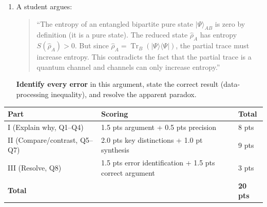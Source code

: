 \documentclass[11pt,a4paper]{article}
\begin{document}
\begin{tcolorbox}[gradconceptbox, title={Part III --- Identify and Resolve \hfill\normalfont 1 $\times$ 3 pts = 3 pts}]

\begin{enumerate}[leftmargin=1.8em, label=\textbf{Q\arabic*.}, itemsep=14pt, start=8]

\item {}
  A student argues:
  \begin{quote}
  ``The entropy of an entangled bipartite pure state $|\Psi\rangle_{AB}$ is zero
  by definition (it is a pure state). The reduced state $\hat{\rho}_A$ has entropy
  $S(\hat{\rho}_A)>0$. But since $\hat{\rho}_A=\operatorname{Tr}_B(|\Psi\rangle\langle\Psi|)$,
  the partial trace must increase entropy. This contradicts the fact that the
  partial trace is a quantum channel and channels can only increase entropy.''
  \end{quote}
  \textbf{Identify every error} in this argument, state the correct result
  (data-processing inequality), and resolve the apparent paradox.

  \vspace{4cm}

\end{enumerate}
\end{tcolorbox}

\begin{tcolorbox}[rubricbox, title={CCQG Rubric}]
\begin{tabular}{lll}
\toprule
Part & Scoring & Total\\
\midrule
I (Explain why, Q1--Q4)      & 1.5 pts argument + 0.5 pts precision & 8 pts\\
II (Compare/contrast, Q5--Q7) & 2.0 pts key distinctions + 1.0 pt synthesis & 9 pts\\
III (Resolve, Q8)             & 1.5 pts error identification + 1.5 pts correct argument & 3 pts\\
\midrule
\textbf{Total} & & \textbf{20 pts}\\
\bottomrule
\end{tabular}
\end{tcolorbox}
\end{document}
